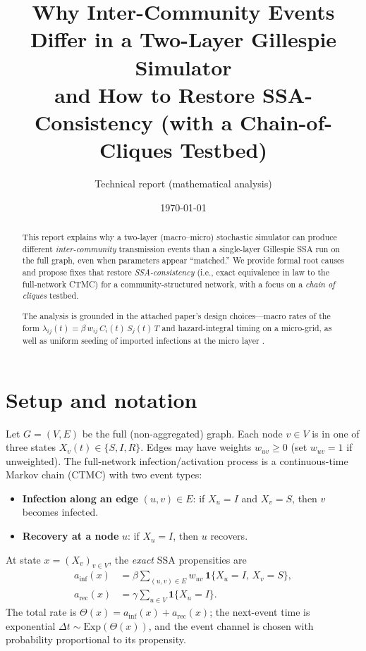 \documentclass[11pt,a4paper]{article}
\title{Why Inter-Community Events Differ in a Two-Layer Gillespie Simulator\\
and How to Restore SSA-Consistency (with a Chain-of-Cliques Testbed)}
\author{Technical report (mathematical analysis)}
\date{\today}
\begin{document}
\maketitle

\begin{abstract}
This report explains why a two-layer (macro--micro) stochastic simulator can produce different
\emph{inter-community} transmission events than a single-layer Gillespie SSA run on the full graph,
even when parameters appear ``matched.'' We provide formal root causes and propose fixes that
restore \emph{SSA-consistency} (i.e., exact equivalence in law to the full-network CTMC) for a
community-structured network, with a focus on a \emph{chain of cliques} testbed.

The analysis is grounded in the attached paper's design choices---macro rates of the form
$\lambda_{ij}(t)=\beta\,w_{ij}\,C_i(t)\,S_j(t)\,T$ and hazard-integral timing on a micro-grid, as well as
uniform seeding of imported infections at the micro layer \cite{paper}.
\end{abstract}

\section{Setup and notation}

Let $G=(V,E)$ be the full (non-aggregated) graph. Each node $v\in V$ is in one of three states
$X_v(t)\in\{S,I,R\}$. Edges may have weights $w_{uv}\ge 0$ (set $w_{uv}=1$ if unweighted).
The full-network infection/activation process is a continuous-time Markov chain (CTMC) with two
event types:

\begin{itemize}[leftmargin=*]
\item \textbf{Infection along an edge} $(u,v)\in E$: if $X_u=I$ and $X_v=S$, then $v$ becomes infected.
\item \textbf{Recovery at a node} $u$: if $X_u=I$, then $u$ recovers.
\end{itemize}

At state $x=(X_v)_{v\in V}$, the \emph{exact} SSA propensities are
\begin{align}
a_{\text{inf}}(x) &= \beta \sum_{(u,v)\in E} w_{uv}\,\mathbf{1}\{X_u=I,\,X_v=S\},\\
a_{\text{rec}}(x) &= \gamma \sum_{u\in V}\mathbf{1}\{X_u=I\}.
\end{align}
The total rate is $\Theta(x)=a_{\text{inf}}(x)+a_{\text{rec}}(x)$; the next-event time is exponential
$\Delta t\sim \mathrm{Exp}(\Theta(x))$, and the event channel is chosen with probability proportional to its
propensity.
\end{document}
